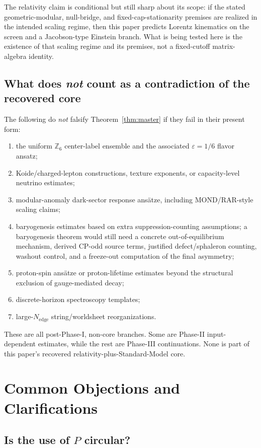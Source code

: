 \documentclass[11pt]{article}
\begin{document}
The relativity claim is conditional but still sharp about its scope: if the stated geometric-modular, null-bridge, and fixed-cap-stationarity premises are realized in the intended scaling regime, then this paper predicts Lorentz kinematics on the screen and a Jacobson-type Einstein branch. What is being tested here is the existence of that scaling regime and its premises, not a fixed-cutoff matrix-algebra identity.

\subsection{What does \emph{not} count as a contradiction of the recovered core}

The following do \emph{not} falsify Theorem~\ref{thm:master} if they fail in their present form:
\begin{enumerate}[leftmargin=2em]
\item the uniform $\mathbb Z_6$ center-label ensemble and the associated $\varepsilon=1/6$ flavor ansatz;
\item Koide/charged-lepton constructions, texture exponents, or capacity-level neutrino estimates;
\item modular-anomaly dark-sector response ans\"atze, including MOND/RAR-style scaling claims;
\item baryogenesis estimates based on extra suppression-counting assumptions; a baryogenesis theorem would still need a concrete out-of-equilibrium mechanism, derived CP-odd source terms, justified defect/sphaleron counting, washout control, and a freeze-out computation of the final asymmetry;
\item proton-spin ans\"atze or proton-lifetime estimates beyond the structural exclusion of gauge-mediated decay;
\item discrete-horizon spectroscopy templates;
\item large-$N_{\mathrm{edge}}$ string/worldsheet reorganizations.
\end{enumerate}
These are all post-Phase-I, non-core branches. Some are Phase-II input-dependent estimates, while the rest are Phase-III continuations. None is part of this paper's recovered relativity-plus-Standard-Model core.

\section{Common Objections and Clarifications}

\subsection{\texorpdfstring{Is the use of $P$ circular?}{Is the use of P circular?}}
\end{document}
